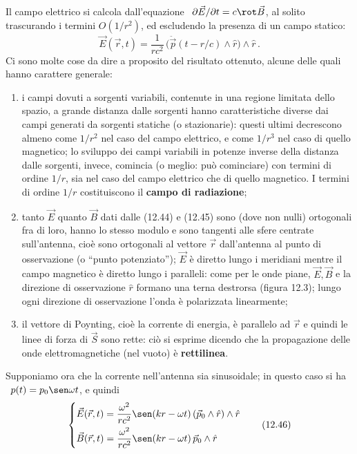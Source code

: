 Il campo elettrico si calcola dall'equazione
\ $\partial\vec E/\partial t=c\rot\vec B$, al solito trascurando i termini
$O(1/r^2)$, ed escludendo la presenza di un campo statico:
\begin{equation}
  \vec E(\vec r,t)=\frac{1}{rc^2}\,\big(\ddot{\vec p}(t-r/c)\wedge\hat r\big)
  \wedge\hat r\,.
  \tag{12.45}
\end{equation}
Ci sono molte cose da dire a proposito del risultato ottenuto, alcune delle
quali hanno carattere generale:
\begin{enumerate}
  \item i campi dovuti a sorgenti variabili, contenute in una regione limitata
    dello spazio, a grande distanza dalle sorgenti hanno caratteristiche diverse
    dai campi generati da sorgenti statiche (o stazionarie): questi ultimi
    decrescono almeno come $1/r^2$ nel caso del campo elettrico, e come $1/r^3$
    nel caso di quello magnetico; lo sviluppo dei campi variabili in potenze
    inverse della distanza dalle sorgenti, invece, comincia (o meglio: pu\`o
    cominciare) con termini di ordine $1/r$, sia nel caso del campo elettrico
    che di quello magnetico. I termini di ordine $1/r$ costituiscono il
    \textbf{campo di radiazione};
  \item tanto $\vec E$ quanto $\vec B$ dati dalle (12.44) e (12.45) sono (dove
    non nulli) ortogonali fra di loro, hanno lo stesso modulo e sono tangenti
    alle sfere centrate sull'antenna, cio\`e sono ortogonali al vettore $\vec r$
    dall'antenna al punto di osservazione (o ``punto potenziato''); $\vec E$ \`e
    diretto lungo i meridiani mentre il campo magnetico \`e diretto lungo i
    paralleli: come per le onde piane, $\vec E,\vec B$ e la direzione di
    osservazione $\hat r$ formano una terna destrorsa (figura 12.3); lungo ogni
    direzione di osservazione l'onda \`e polarizzata linearmente;
  \item il vettore di Poynting, cio\`e la corrente di energia, \`e parallelo ad
    $\vec r$ e quindi le linee di forza di $\vec S$ sono rette: ci\`o si esprime
    dicendo che la propagazione delle onde elettromagnetiche (nel vuoto) \`e
    \textbf{rettilinea}.
\end{enumerate}
Supponiamo ora che la corrente nell'antenna sia sinusoidale; in questo caso si
ha \ $p(t)=p_0\sen\omega t$, e quindi
\begin{equation}
  \left\{\begin{aligned}
    &\vec E(\vec r,t)=\frac{\omega^2}{rc^2}
    \sen(kr-\omega t)\,(\vec p_0\wedge\hat r)\wedge\hat r\\
    &\vec B(\vec r,t)=\frac{\omega^2}{rc^2}
    \sen(kr-\omega t)\,\vec p_0\wedge\hat r
  \end{aligned}\right.
  \tag{12.46}
\end{equation}
